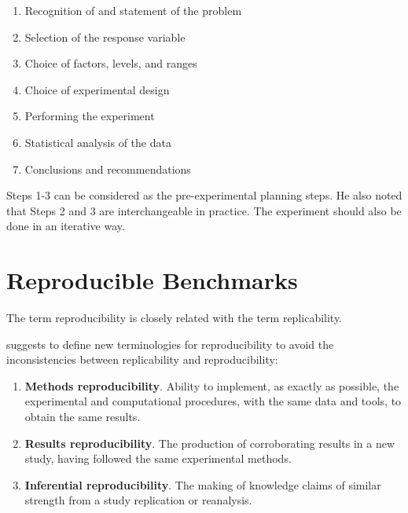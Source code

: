 
\begin{enumerate}[noitemsep]
	\item Recognition of and statement of the problem
	\item Selection of the response variable
	\item Choice of factors, levels, and ranges
	\item Choice of experimental design
	\item Performing the experiment
	\item Statistical analysis of the data
	\item Conclusions and recommendations
\end{enumerate}

Steps 1-3 can be considered as the pre-experimental planning steps.
He also noted that Steps 2 and 3 are interchangeable in practice.
The experiment should also be done in an iterative way.



\section{Reproducible Benchmarks}
\label{sec:reproducibleBenchmarks}

The term reproducibility is closely related with the term replicability.

\citet{goodmanWhatDoesResearch2016} suggests to define new terminologies for reproducibility to avoid the inconsistencies between replicability and reproducibility:
\begin{enumerate}
	\item \textbf{Methods reproducibility}. Ability to implement, as exactly as possible, the experimental and computational procedures, with the same data and tools, to obtain the same results.
	\item \textbf{Results reproducibility}. The production of corroborating results in a new study, having followed the same experimental methods.
	\item \textbf{Inferential reproducibility}. The making of knowledge claims of similar strength from a study replication or reanalysis.
\end{enumerate}


